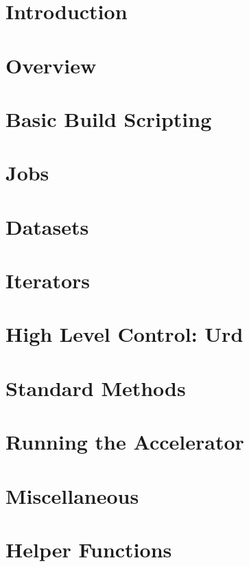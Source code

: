 \documentclass[a4paper]{report}
\begin{document}
\newpage
\tableofcontents

\chapter{Introduction}


\chapter{Overview}


\chapter{Basic Build Scripting}


\chapter{Jobs}


\chapter{Datasets}


\chapter{Iterators}


\chapter{High Level Control:  Urd}


\chapter{Standard Methods}


\chapter{Running the Accelerator}


\appendix

\chapter{Miscellaneous}


\chapter{Helper Functions}






\end{document}
